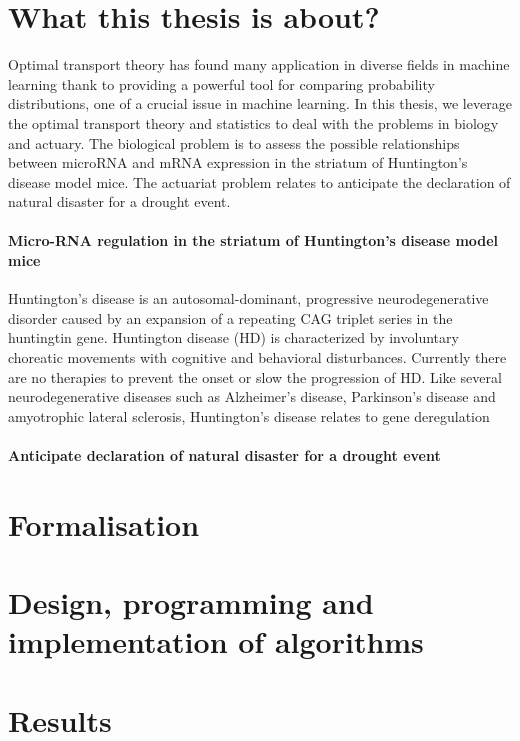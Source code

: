 \section{What this thesis is about?}

Optimal transport theory has found many application in diverse fields in machine learning thank to 
providing a powerful tool for comparing probability distributions, one of a crucial issue
in machine learning.  In this thesis, we leverage the optimal transport theory and statistics to deal with 
the problems in biology and actuary. The biological problem is to assess the possible relationships between microRNA and mRNA expression in the striatum of Huntington's disease model mice. The actuariat problem relates to anticipate the declaration of natural disaster for a drought event. 

\paragraph{Micro-RNA regulation in the striatum of Huntington’s disease model mice}
Huntington's disease is an autosomal-dominant, progressive neurodegenerative disorder caused by an expansion of  a repeating CAG triplet series in the huntingtin gene. Huntington disease (HD) is characterized by involuntary choreatic movements with cognitive and behavioral disturbances. Currently there are no therapies to prevent the onset or slow the progression of HD. 
 Like several neurodegenerative diseases such as Alzheimer's disease, Parkinson's disease and amyotrophic lateral sclerosis, Huntington's disease relates to gene deregulation 

\paragraph{Anticipate declaration of natural disaster for a drought event}

\section{Formalisation}
\section{Design, programming and implementation of algorithms}
\section{Results}
